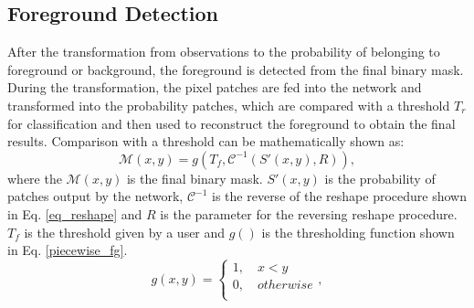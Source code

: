\documentclass[journal]{IEEEtran}
\newcommand{\reffig}[1]{Fig. \ref{#1}}
\newcommand{\refeq}[1]{Eq. \ref{#1}}
\begin{document}
\subsection{Foreground Detection}
After the transformation from observations to the probability of belonging to foreground or background,
the foreground is detected from the final binary mask.
%
During the transformation,
the pixel patches are fed into the network and transformed into the probability patches,
which are compared with a threshold $T_r$ for classification and then used to reconstruct the foreground to obtain the final results.
%
Comparison with a threshold can be mathematically shown as:
\begin{equation}
    \mathcal{M}(x,y) = g(T_f, \mathcal{C}^{-1}(S'(x,y), R)),
\end{equation}
where the $\mathcal{M}(x,y)$ is the final binary mask.
%
$S'(x,y)$ is the probability of patches output by the network,
$\mathcal{C}^{-1}$ is the reverse of the reshape procedure shown in \refeq{eq_reshape} and $R$ is the parameter for the reversing reshape procedure.
%
$T_f$ is the threshold given by a user and $g()$ is the thresholding function shown in \refeq{piecewise_fg}.
% 
% 
% 
% 
% 
\begin{equation}
    \label{piecewise_fg}
    g(x,y) =
 \begin{cases}
  1,  \quad x < y       \\
  0,  \quad otherwise   \\
\end{cases},
\end{equation}
%


\end{document}
